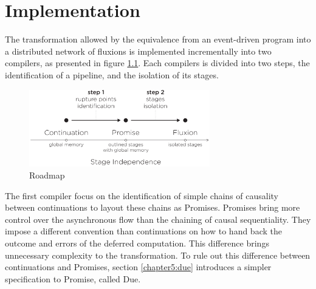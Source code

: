\chapter{Implementation} \label{chapter5}
\minitoc
\eject
The transformation allowed by the equivalence from an event-driven program into a distributed network of fluxions is implemented incrementally into two compilers, as presented in figure \ref{fig:roadmap}.
Each compilers is divided into two steps, the identification of a pipeline, and the isolation of its stages.

\begin{figure}[h!]
\begin{center}
\includegraphics[width=0.7\textwidth]{../resources/roadmap.pdf}
\end{center}
\caption{Roadmap}
\label{fig:roadmap}
\end{figure}

The first compiler focus on the identification of simple chains of causality between continuations to layout these chains as Promises.
Promises bring more control over the asynchronous flow than the chaining of causal sequentiality.
They impose a different convention than continuations on how to hand back the outcome and errors of the deferred computation.
This difference brings unnecessary complexity to the transformation.
To rule out this difference between continuations and Promises, section \ref{chapter5:due} introduces a simpler specification to Promise, called Due.

